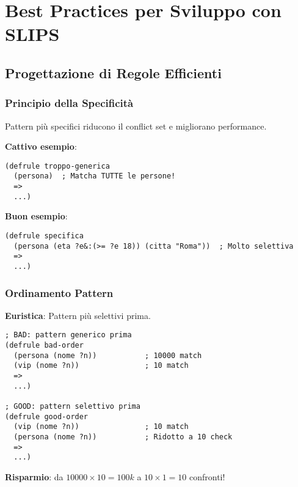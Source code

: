
\chapter{Best Practices per Sviluppo con SLIPS}
\label{cap:best_practices}

\section{Progettazione di Regole Efficienti}

\subsection{Principio della Specificità}

\begin{infobox}
Pattern più specifici riducono il conflict set e migliorano performance.
\end{infobox}

\textbf{Cattivo esempio}:
\begin{lstlisting}[language=CLIPS]
(defrule troppo-generica
  (persona)  ; Matcha TUTTE le persone!
  =>
  ...)
\end{lstlisting}

\textbf{Buon esempio}:
\begin{lstlisting}[language=CLIPS]
(defrule specifica
  (persona (eta ?e&:(>= ?e 18)) (citta "Roma"))  ; Molto selettiva
  =>
  ...)
\end{lstlisting}

\subsection{Ordinamento Pattern}

\textbf{Euristica}: Pattern più selettivi prima.

\begin{lstlisting}[language=CLIPS]
; BAD: pattern generico prima
(defrule bad-order
  (persona (nome ?n))           ; 10000 match
  (vip (nome ?n))               ; 10 match
  =>
  ...)

; GOOD: pattern selettivo prima
(defrule good-order
  (vip (nome ?n))               ; 10 match
  (persona (nome ?n))           ; Ridotto a 10 check
  =>
  ...)
\end{lstlisting}

\textbf{Risparmio}: da $10000 \times 10 = 100k$ a $10 \times 1 = 10$ confronti!

